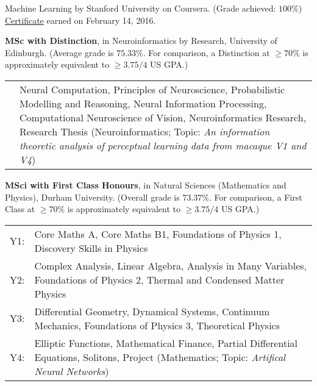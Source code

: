 \documentclass[11pt, a4paper]{article} %
\newcommand{\years}[1]{\marginnote{\scriptsize #1}} %
\renewenvironment{itemize}{
  \begin{list}{}{
    \setlength{\leftmargin}{0em}
  }
}{
  \end{list}
}
\begin{document}
\begin{itemize}
%
%
\item \years{Feb 2016}Machine Learning by Stanford University on Coursera. \footnotesize(Grade achieved: $100\%$)
\href{https://www.coursera.org/account/accomplishments/records/C3BHEHRLC4HT}{Certificate} earned on February 14, 2016.
%
\item \years{2011--2012}\textbf{MSc with Distinction}, in Neuroinformatics by Research, University of Edinburgh. {\footnotesize(Average grade is $75.33\%$.
For comparison, a Distinction at $\ge70\%$ is approximately equivalent to $\ge3.75/4$ US GPA.)}\\
{\footnotesize
\begin{tabular}{lp{11.5cm}}
 &Neural Computation, Principles of Neuroscience, Probabilistic Modelling and Reasoning, Neural Information Processing, Computational Neuroscience of Vision, Neuroinformatics Research, Research Thesis (Neuroinformatics; Topic: \emph{An information theoretic analysis of perceptual learning data from macaque V1 and V4})\\
\end{tabular}
}
%
\item \years{2007--2011}\textbf{MSci with First Class Honours}, in Natural Sciences (Mathematics and Physics), Durham University. {\footnotesize(Overall grade is $73.37\%$.
For comparison, a First Class at $\ge70\%$ is approximately equivalent to $\ge3.75/4$ US GPA.)}\\
{\footnotesize
\begin{tabular}{lp{11.5cm}}
Y1:&Core Maths A, Core Maths B1, Foundations of Physics 1, Discovery Skills in Physics\\
Y2:&Complex Analysis, Linear Algebra, Analysis in Many Variables, Foundations of Physics 2, Thermal and Condensed Matter Physics\\
Y3:&Differential Geometry, Dynamical Systems, Continuum Mechanics, Foundations of Physics 3, Theoretical Physics\\
Y4:&Elliptic Functions, Mathematical Finance, Partial Differential Equations, Solitons, Project (Mathematics; Topic: \emph{Artifical Neural Networks})\\
\end{tabular}
}
%
\end{itemize}

\end{document}
